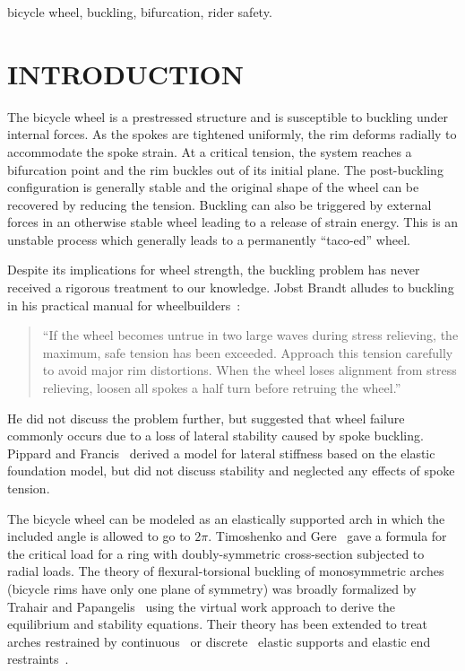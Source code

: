 \documentclass{bmd2016p}
\begin{document}
\begin{keywords}
bicycle wheel, 
buckling, 
bifurcation,
rider safety.
\end{keywords}





\section{INTRODUCTION}

The bicycle wheel is a prestressed structure and is susceptible to buckling under internal forces. As the spokes are tightened uniformly, the rim deforms radially to accommodate the spoke strain. At a critical tension, the system reaches a bifurcation point and the rim buckles out of its initial plane. The post-buckling configuration is generally stable and the original shape of the wheel can be recovered by reducing the tension. Buckling can also be triggered by external forces in an otherwise stable wheel leading to a release of strain energy. This is an unstable process which generally leads to a permanently ``taco-ed'' wheel.

Despite its implications for wheel strength, the buckling problem has never received a rigorous treatment to our knowledge. Jobst Brandt alludes to buckling in his practical manual for wheelbuilders~\cite{Brandt1993c}:

\begin{quotation}
\noindent``If the wheel becomes untrue in two large waves during stress relieving, the maximum, safe tension has been exceeded. Approach this tension carefully to avoid major rim distortions. When the wheel loses alignment from stress relieving, loosen all spokes a half turn before retruing the wheel.''
\end{quotation}

He did not discuss the problem further, but suggested that wheel failure commonly occurs due to a loss of lateral stability caused by spoke buckling. Pippard and Francis~\cite{Pippard1932d} derived a model for lateral stiffness based on the elastic foundation model, but did not discuss stability and neglected any effects of spoke tension.

The bicycle wheel can be modeled as an elastically supported arch in which the included angle is allowed to go to $2\pi$. Timoshenko and Gere~\cite{Timoshenko1961a} gave a formula for the critical load for a ring with doubly-symmetric cross-section subjected to radial loads. The theory of flexural-torsional buckling of monosymmetric arches (bicycle rims have only one plane of symmetry) was broadly formalized by Trahair and Papangelis~\cite{Trahair1987b} using the virtual work approach to derive the equilibrium and stability equations. Their theory has been extended to treat arches restrained by continuous~\cite{Pi2002b} or discrete~\cite{Bradford2002d} elastic supports and elastic end restraints~\cite{Guo2014b}.
\end{document}
